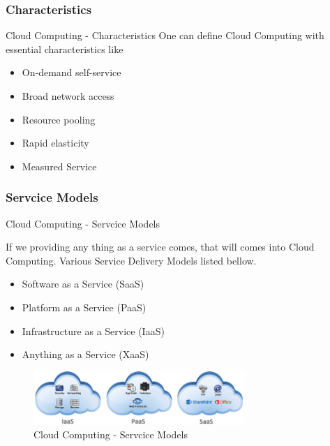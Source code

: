 \documentclass[xcolor=dvipsnames]{beamer}
\begin{document}
\subsubsection{Characteristics}
\begin{frame} {Cloud Computing - Characteristics }
One can define Cloud Computing with essential characteristics like

\begin{itemize}
\item On-demand self-service
\item Broad network access
\item Resource pooling
\item Rapid elasticity
\item Measured Service
\end{itemize}
\end{frame}
\subsubsection{Servcice Models}
\begin{frame}{Cloud Computing - Servcice Models }

If we providing any thing as a service comes, that will comes into Cloud Computing. Various Service Delivery Models listed bellow.

\begin{itemize}
\item Software as a Service (SaaS) 
\item Platform as a Service (PaaS)
\item Infrastructure as a Service (IaaS)
\item Anything as a Service (XaaS)
\end{itemize}
\begin{figure}[H]
 \centering
 \includegraphics[width=8cm]{./service.png}
 \caption{Cloud Computing - Servcice Models \label{fig:Cloud Computing - Servcice Models} }
\end{figure}

\end{frame}
\end{document}
